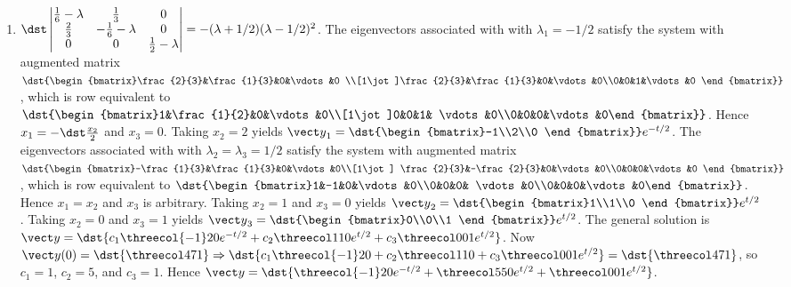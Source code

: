 \documentclass[openany]{book}
\newenvironment{sectionSolutions}{
 \begin{enumerate}[item-label={\thesection.\arabic{enumi}.}]
}{
 \end{enumerate}
}
\begin{document}
\begin{sectionSolutions}
\item
$\dst\begin{vmatrix}
\frac{1}{6}-\lambda&\frac{1}{3}&0\\
\frac{2}{3}&-\frac{1}{6}-\lambda&0\\
0&0&\frac{1}{2}-\lambda
\end{vmatrix}=-(\lambda+1/2)(\lambda-1/2)^2$.
The eigenvectors associated with
 with $\lambda_1=-1/2$ satisfy the system with  augmented matrix
$\dst{\begin{bmatrix}\frac{2}{3}&\frac{1}{3}&0&\vdots&0
\\[1\jot]\frac{2}{3}&\frac{1}{3}&0&\vdots&0\\0&0&1&\vdots&0
\end{bmatrix}}$,
which is row equivalent to
$\dst{\begin{bmatrix}1&\frac{1}{2}&0&\vdots&0\\[1\jot]0&0&1&
\vdots&0\\0&0&0&\vdots&0\end{bmatrix}}$.
Hence $x_1=-\dst\frac{x_2}{2}$ and $x_3=0$.  Taking $x_2=2$ yields
${\vect y}_1=\dst{\begin{bmatrix}-1\\2\\0
\end{bmatrix}}e^{-t/2}$.
The eigenvectors associated with
 with $\lambda_2=\lambda_3=1/2$ satisfy the system with  augmented
matrix
$\dst{\begin{bmatrix}-\frac{1}{3}&\frac{1}{3}&0&\vdots&0\\[1\jot]
\frac{2}{3}&-\frac{2}{3}&0&\vdots&0\\0&0&0&\vdots&0
\end{bmatrix}}$,
which is row equivalent to
$\dst{\begin{bmatrix}1&-1&0&\vdots&0\\0&0&0&
\vdots&0\\0&0&0&\vdots&0\end{bmatrix}}$.
Hence $x_1=x_2$ and $x_3$ is arbitrary.  Taking $x_2=1$ and $x_3=0$
yields
${\vect y}_2=\dst{\begin{bmatrix}1\\1\\0
\end{bmatrix}}e^{t/2}$.
Taking $x_2=0$ and $x_3=1$ yields
${\vect y}_3=\dst{\begin{bmatrix}0\\0\\1
\end{bmatrix}}e^{t/2}$.
 The general solution is
${\vect y}=\dst{c_1\threecol{-1}20e^{-t/2}+
c_2\threecol110e^{t/2}+c_3\threecol001e^{t/2}}$.
Now ${\vect y}(0)=\dst{\threecol471}\Rightarrow
\dst{c_1\threecol{-1}20+
c_2\threecol110+c_3\threecol001e^{t/2}}=\dst{\threecol471}$,
so $c_1=1$, $c_2=5$, and $c_3=1$. Hence
${\vect y}=\dst{\threecol{-1}20e^{-t/2}+
\threecol550e^{t/2}+\threecol001e^{t/2}}$.



\end{sectionSolutions}
\end{document}
